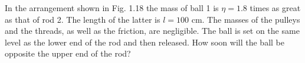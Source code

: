 \item In the arrangement shown in Fig. 1.18 the mass of ball 1 is \(\eta = 1.8\) times as great as that of rod 2. The length of the latter is \(l = 100\) cm. The masses of the pulleys and the threads, as well as the friction, are negligible. The ball is set on the same level as the lower end of the rod and then released. How soon will the ball be opposite the upper end of the rod?
    \begin{center}
    \end{center}